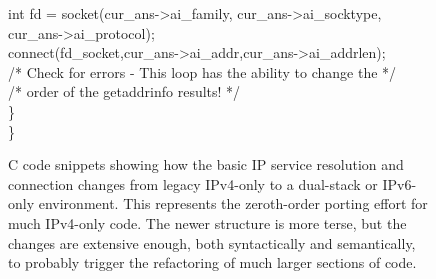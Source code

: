 \begin{figure}
\begin{framed}
{\qquad\qquad int fd = socket(cur\_ans->ai\_family, cur\_ans->ai\_socktype,\\
\qquad\qquad\qquad cur\_ans->ai\_protocol);\\
\qquad\qquad connect(fd\_socket,cur\_ans->ai\_addr,cur\_ans->ai\_addrlen);\\
\qquad\qquad /* Check for errors - This loop has the ability to change the */\\
\qquad\qquad /* order of the getaddrinfo results! */\\
\qquad \}\\
\}
}
\end{framed}
\caption{C code snippets showing how the basic IP service resolution and connection 
 changes from legacy IPv4-only to a dual-stack or IPv6-only environment. This represents
 the zeroth-order porting effort for much IPv4-only code. The newer structure
 is more terse, but the changes are extensive enough, both syntactically and
 semantically, to probably trigger the refactoring of much larger sections of code.}
\label{fig:pseudocode}
\end{figure}
